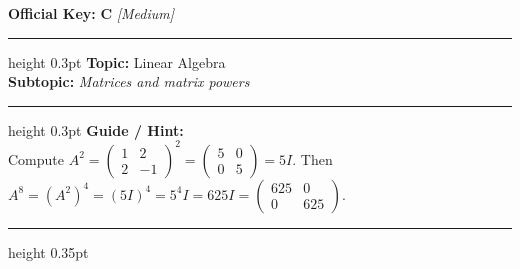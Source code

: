 \documentclass[a4paper,10pt]{article}
\begin{document}
\begin{tcolorbox}
\textbf{Official Key:} \textbf{\large C} \hfill \textit{\small [Medium]}
\vspace{2pt}\hrule height 0.3pt\vspace{3pt}
\textbf{Topic:} Linear Algebra \\
\textbf{Subtopic:} \textit{Matrices and matrix powers}
\vspace{2pt}\hrule height 0.3pt\vspace{3pt}
\textbf{Guide / Hint:} \\
{\small Compute $A^2 = \begin{pmatrix} 1 & 2 \\ 2 & -1 \end{pmatrix}^2 = \begin{pmatrix} 5 & 0 \\ 0 & 5 \end{pmatrix} = 5I$. Then $A^8 = (A^2)^4 = (5I)^4 = 5^4 I = 625I = \begin{pmatrix} 625 & 0 \\ 0 & 625 \end{pmatrix}$.}

\end{tcolorbox}
\vspace{6pt}\hrule height 0.35pt\vspace{6pt}
\noindent
\end{document}
